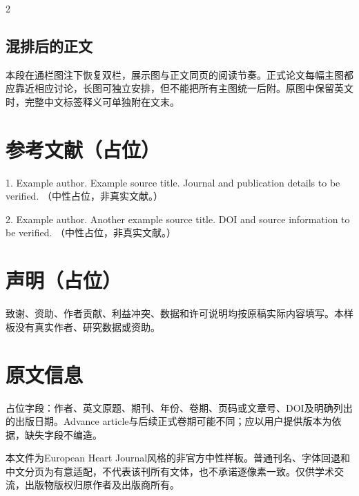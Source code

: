 \documentclass[UTF8,fontset=none,scheme=plain]{ctexart}
\begin{document}
\begin{multicols}{2}
\subsection*{混排后的正文}
本段在通栏图注下恢复双栏，展示图与正文同页的阅读节奏。正式论文每幅主图都应靠近相应讨论，长图可独立安排，但不能把所有主图统一后附。原图中保留英文时，完整中文标签释义可单独附在文末。
\section*{参考文献（占位）}
{\fontsize{7.5bp}{10bp}\selectfont\setlength{\parindent}{0pt}
\hypertarget{ref:1}{}1. Example author. Example source title. Journal and publication details to be verified. （中性占位，非真实文献。）\par\smallskip
\hypertarget{ref:2}{}2. Example author. Another example source title. DOI and source information to be verified. （中性占位，非真实文献。）\par}
\section*{声明（占位）}
致谢、资助、作者贡献、利益冲突、数据和许可说明均按原稿实际内容填写。本样板没有真实作者、研究数据或资助。
\section*{原文信息}
占位字段：作者、英文原题、期刊、年份、卷期、页码或文章号、DOI及明确列出的出版日期。Advance article与后续正式卷期可能不同；应以用户提供版本为依据，缺失字段不编造。

本文件为European Heart Journal风格的非官方中性样板。普通刊名、字体回退和中文分页为有意适配，不代表该刊所有文体，也不承诺逐像素一致。仅供学术交流，出版物版权归原作者及出版商所有。
\end{multicols}
\end{document}
